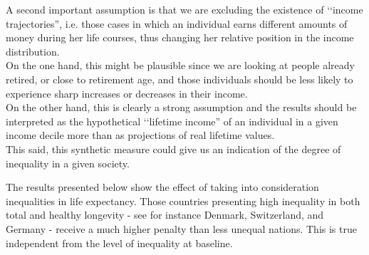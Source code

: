 A second important assumption is that we are excluding the existence of \lq\lq income trajectories'', i.e. those cases in which an individual earns different amounts of money during her life courses, thus changing her relative position in the income distribution. \\
On the one hand, this might be plausible since we are looking at people already retired, or close to retirement age, and those individuals should be less likely to experience sharp increases or decreases in their income.\\
On the other hand, this is clearly a strong assumption and the results should be interpreted as the hypothetical \lq\lq lifetime income'' of an individual in a given income decile more than as projections of real lifetime values.\\
This said, this synthetic measure could give us an indication of the degree of inequality in a given society.\\

\newpage

The results presented below show the effect of taking into consideration inequalities in life expectancy. 
Those countries presenting high inequality in both total and healthy longevity - see for instance Denmark, Switzerland, and Germany - receive a much higher penalty than less unequal nations. This is true independent from the level of inequality at baseline.


